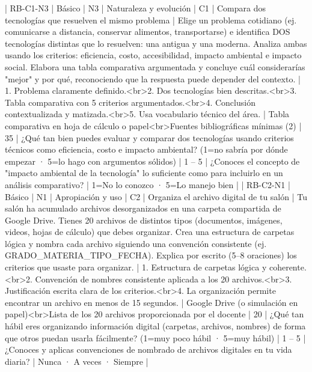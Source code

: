 | RB-C1-N3 | Básico | N3 | Naturaleza y evolución | C1 | Compara dos tecnologías que resuelven el mismo problema | Elige un problema cotidiano (ej. comunicarse a distancia, conservar alimentos, transportarse) e identifica DOS tecnologías distintas que lo resuelven: una antigua y una moderna. Analiza ambas usando los criterios: eficiencia, costo, accesibilidad, impacto ambiental e impacto social. Elabora una tabla comparativa argumentada y concluye cuál considerarías "mejor" y por qué, reconociendo que la respuesta puede depender del contexto. | 1. Problema claramente definido.<br>2. Dos tecnologías bien descritas.<br>3. Tabla comparativa con 5 criterios argumentados.<br>4. Conclusión contextualizada y matizada.<br>5. Usa vocabulario técnico del área. | Tabla comparativa en hoja de cálculo o papel<br>Fuentes bibliográficas mínimas (2) | 35 | ¿Qué tan bien puedes evaluar y comparar dos tecnologías usando criterios técnicos como eficiencia, costo e impacto ambiental? (1=no sabría por dónde empezar · 5=lo hago con argumentos sólidos) | 1 – 5 | ¿Conoces el concepto de "impacto ambiental de la tecnología" lo suficiente como para incluirlo en un análisis comparativo? | 1=No lo conozco · 5=Lo manejo bien |
| RB-C2-N1 | Básico | N1 | Apropiación y uso | C2 | Organiza el archivo digital de tu salón | Tu salón ha acumulado archivos desorganizados en una carpeta compartida de Google Drive. Tienes 20 archivos de distintos tipos (documentos, imágenes, videos, hojas de cálculo) que debes organizar. Crea una estructura de carpetas lógica y nombra cada archivo siguiendo una convención consistente (ej. GRADO_MATERIA_TIPO_FECHA). Explica por escrito (5–8 oraciones) los criterios que usaste para organizar. | 1. Estructura de carpetas lógica y coherente.<br>2. Convención de nombres consistente aplicada a los 20 archivos.<br>3. Justificación escrita clara de los criterios.<br>4. La organización permite encontrar un archivo en menos de 15 segundos. | Google Drive (o simulación en papel)<br>Lista de los 20 archivos proporcionada por el docente | 20 | ¿Qué tan hábil eres organizando información digital (carpetas, archivos, nombres) de forma que otros puedan usarla fácilmente? (1=muy poco hábil · 5=muy hábil) | 1 – 5 | ¿Conoces y aplicas convenciones de nombrado de archivos digitales en tu vida diaria? | Nunca · A veces · Siempre |
